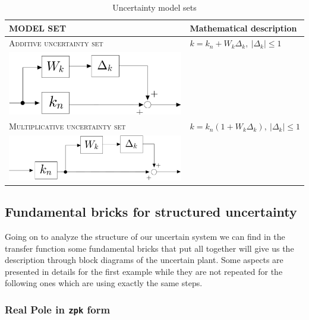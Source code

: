 \documentclass[a4paper, 12pt]{article}
\begin{document}
\begin{table}[h]
    \centering
    \begin{tabular}{p{8cm} p{6cm}}
        \toprule[1pt]
        \textbf{MODEL SET}&\textbf{Mathematical description}\\
        \midrule
        \textsc{Additive uncertainty set}&$k=k_n+W_k{\Delta_k}, \ \vert \Delta_k \vert \le 1$  \\\includegraphics[scale=0.12]{img/add_k.jpg}\\
        \midrule
        \textsc{Multiplicative uncertainty set}&$k=k_n(1+W_k\Delta_k), \ \vert \Delta_k \vert \le1$ \\ \includegraphics[scale=0.14]{img/mul_k.jpg}\\
        \bottomrule[1pt]
    \end{tabular}
    \caption{Uncertainty model sets}
    \label{tab:uncertainty_set}
\end{table}


\subsection{Fundamental bricks for structured uncertainty}
Going on to analyze the structure of our uncertain system we can find in the transfer function some fundamental bricks that put all together will give us the description through block diagrams of the uncertain plant. \textsf{Some aspects are presented in details for the first example while they are not repeated for the following ones which are using exactly the same steps.}

\subsubsection{Real Pole in \texttt{zpk} form}
\end{document}
